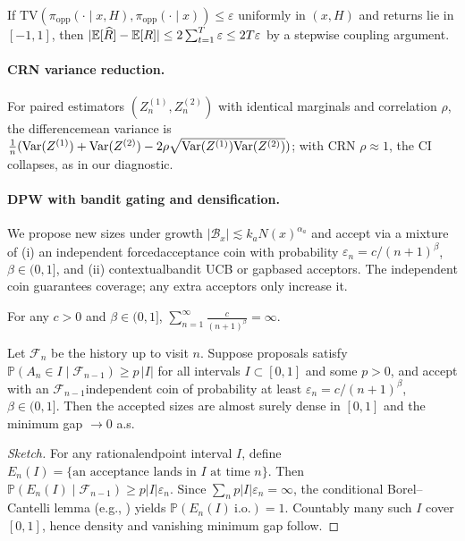 \begin{proposition}
If $\mathrm{TV}(\pi_{\mathrm{opp}}(\cdot\mid x,H),\pi_{\mathrm{opp}}(\cdot\mid x))\le \varepsilon$ uniformly in $(x,H)$ and returns lie in $[-1,1]$, then $|\mathbb{E}[\widehat{R}]-\mathbb{E}[R]|\le 2\sum_{t=1}^T \varepsilon \le 2T\varepsilon$ by a stepwise coupling argument.
\end{proposition}

\paragraph{CRN variance reduction.}
For paired estimators $(Z^{(1)}_n,Z^{(2)}_n)$ with identical marginals and correlation $\rho$, the difference\textendash mean variance is $\frac{1}{n}(\mathrm{Var}(Z^{(1)})+\mathrm{Var}(Z^{(2)})-2\rho\sqrt{\mathrm{Var}(Z^{(1)})\mathrm{Var}(Z^{(2)})})$; with CRN $\rho\approx 1$, the CI collapses, as in our diagnostic.

\paragraph{DPW with bandit gating and densification.}
We propose new sizes under growth $|\mathcal{B}_x|\lesssim k_a N(x)^{\alpha_a}$ and accept via a mixture of (i) an independent forced\textendash acceptance coin with probability $\varepsilon_n=c/(n+1)^\beta$, $\beta\in(0,1]$, and (ii) contextual\textendash bandit UCB or gap\textendash based acceptors. The independent coin guarantees coverage; any extra acceptors only increase it.

\begin{lemma}
For any $c>0$ and $\beta\in(0,1]$, $\sum_{n=1}^{\infty} \frac{c}{(n+1)^\beta}=\infty$.
\end{lemma}

\begin{proposition}\label{prop:densify}
Let $\mathcal{F}_{n}$ be the history up to visit $n$. Suppose proposals satisfy $\mathbb{P}(A_n\in I\mid \mathcal{F}_{n-1})\ge p\,|I|$ for all intervals $I\subset[0,1]$ and some $p>0$, and accept with an $\mathcal{F}_{n-1}$\textendash independent coin of probability at least $\varepsilon_n=c/(n+1)^\beta$, $\beta\in(0,1]$. Then the accepted sizes are almost surely dense in $[0,1]$ and the minimum gap $\to 0$ a.s.
\end{proposition}
\begin{proof}[Sketch]
For any rational\textendash endpoint interval $I$, define $E_n(I)=\{\text{an acceptance lands in }I\text{ at time }n\}$. Then
$
\mathbb{P}(E_n(I)\mid \mathcal{F}_{n-1})\ge p|I|\varepsilon_n.
$
Since $\sum_n p|I|\varepsilon_n=\infty$, the conditional Borel–Cantelli lemma (e.g., \cite[Thm.~4.3.4]{durrett2019probability}) yields $\mathbb{P}(E_n(I)\ \text{i.o.})=1$. Countably many such $I$ cover $[0,1]$, hence density and vanishing minimum gap follow.
\end{proof}

